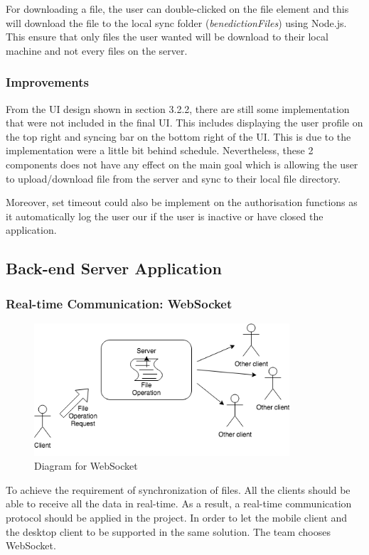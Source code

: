 \documentclass{article}
\begin{document}
For downloading a file, the user can double-clicked on the file element and this will download the file to the local sync folder (\emph{benedictionFiles}) using Node.js. This ensure that only files the user wanted will be download to their local machine and not every files on the server.

\subsubsection{Improvements}
From the UI design shown in section 3.2.2, there are still some implementation that were not included in the final UI. This includes displaying the user profile on the top right and syncing bar on the bottom right of the UI. This is due to the implementation were a little bit behind schedule. Nevertheless, these 2 components does not have any effect on the main goal which is allowing the user to upload/download file from the server and sync to their local file directory.

Moreover, set timeout could also be implement on the authorisation functions as it automatically log the user our if the user is inactive or have closed the application.

\subsection{Back-end Server Application}

\subsubsection{Real-time Communication: WebSocket}
\begin{figure}[H]
\begin{center}
\includegraphics[width=9.5cm]{Backend_Diagram_WebSocket.png}
\end{center}
\caption{Diagram for WebSocket}\label{ex4}
\end{figure}
To achieve the requirement of synchronization of files. All the clients should be able to receive all the data in real-time. As a result, a real-time communication protocol should be applied in the project. In order to let the mobile client and the desktop client to be supported in the same solution. The team chooses WebSocket.
\end{document}
